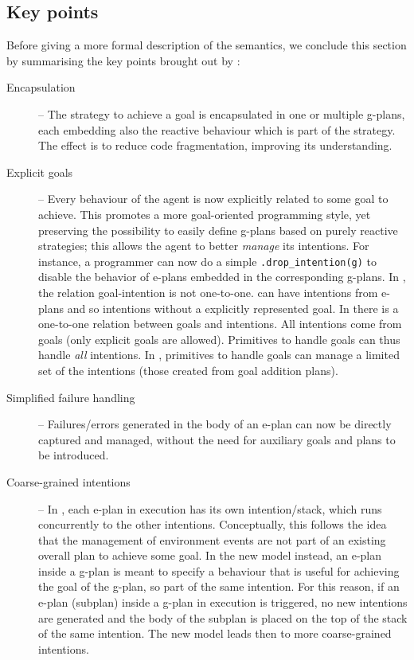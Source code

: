 \subsection{Key points}

Before giving a more formal description of the semantics, we conclude
this section by summarising the key points brought out by {\aser}:
%
\begin{description}
%
\item[Encapsulation] -- The strategy to achieve a goal is encapsulated
  in one or multiple g-plans, each embedding also the reactive
  behaviour which is part of the strategy.
%
  The effect is to reduce code fragmentation, improving its
  understanding.
%
\item[Explicit goals] -- Every behaviour of the agent is now
  explicitly related to some goal to achieve.
%
  This promotes a more goal-oriented programming style, yet preserving
  the possibility to easily define g-plans based on purely reactive
  strategies;
%
  this allows the agent to better \emph{manage} its intentions. For
  instance, a programmer can now do a simple
  \texttt{.drop\_intention(g)} to disable the behavior of e-plans
  embedded in the corresponding g-plans.
%
In {\asl}, the relation goal-intention is not one-to-one. {\asl} can have intentions from e-plans and so intentions without a explicitly represented goal. 
In {\aser} there is a one-to-one relation between goals and intentions. 
%
All intentions come from goals (only explicit goals are allowed). 
%
Primitives to handle goals can thus handle \emph{all} intentions. 
%
In {\asl}, primitives to handle goals can manage a limited set of the
intentions (those created from goal addition plans).


\item[Simplified failure handling] -- Failures/errors generated in the
  body of an e-plan can now be directly captured and managed, without the
  need for auxiliary goals and plans to be introduced.

\item[Coarse-grained intentions] -- In {\asl}, each e-plan in
  execution has its own intention/stack, which runs concurrently to
  the other intentions. Conceptually, this follows the idea that
  the management of environment events are not part of an existing
  overall plan to achieve some goal.
%
  In the new model instead, an e-plan inside a g-plan is meant to
  specify a behaviour that is useful for achieving the goal of the
  g-plan, so part of the same intention.
%
  For this reason, if an e-plan (subplan) inside a g-plan in
  execution is triggered, no new intentions are generated and the body
  of the subplan is placed on the top of the stack of the same
  intention.
%
  The new model leads then to more coarse-grained intentions.
%
%
\end{description}

